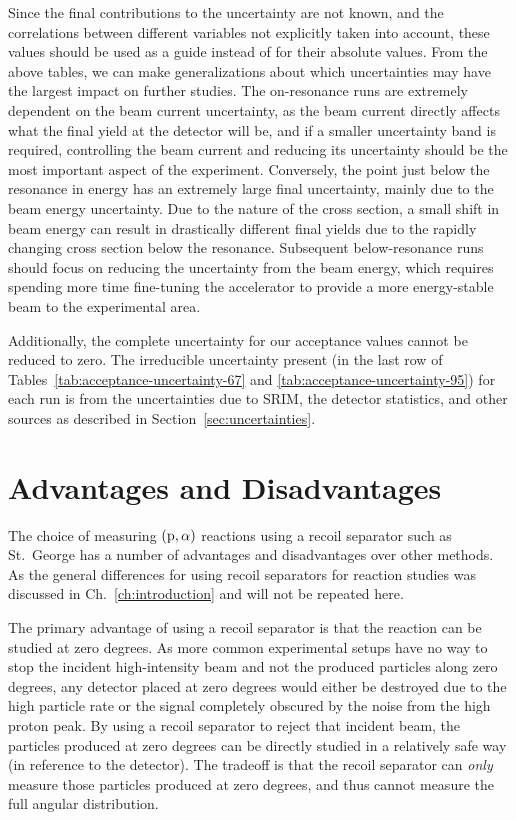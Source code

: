 
Since the final contributions to the uncertainty are not known, and the
correlations between different variables not explicitly taken into
account, these values should be used as a guide instead of for their
absolute values. From the above tables, we can make generalizations
about which uncertainties may have the largest impact on further
studies. The on-resonance runs are extremely dependent on the beam
current uncertainty, as the beam current directly affects what the final
yield at the detector will be, and if a smaller uncertainty band is
required, controlling the beam current and reducing its uncertainty
should be the most important aspect of the experiment. Conversely, the
point just below the resonance in energy has an extremely large final
uncertainty, mainly due to the beam energy uncertainty. Due to the
nature of the cross section, a small shift in beam energy can result in
drastically different final yields due to the rapidly changing cross
section below the resonance. Subsequent below-resonance runs should
focus on reducing the uncertainty from the beam energy, which requires
spending more time fine-tuning the accelerator to provide a more
energy-stable beam to the experimental area.

Additionally, the complete uncertainty for our acceptance values cannot
be reduced to zero. The irreducible uncertainty present (in the last row
of Tables~\ref{tab:acceptance-uncertainty-67} and
\ref{tab:acceptance-uncertainty-95}) for each run is from the
uncertainties due to SRIM, the detector statistics, and other sources as
described in Section~\ref{sec:uncertainties}.


\section{Advantages and Disadvantages}

The choice of measuring $({\rm p},\alpha)$ reactions using a recoil
separator such as St.\ George has a number of advantages and
disadvantages over other methods. As the general differences for using
recoil separators for reaction studies was discussed in
Ch.~\ref{ch:introduction} and will not be repeated here.

The primary advantage of using a recoil separator is that the reaction
can be studied at zero degrees. As more common experimental setups have
no way to stop the incident high-intensity beam and not the produced
particles along zero degrees, any detector placed at zero degrees would
either be destroyed due to the high particle rate or the signal
completely obscured by the noise from the high proton peak. By using a
recoil separator to reject that incident beam, the particles produced at
zero degrees can be directly studied in a relatively safe way (in
reference to the detector). The tradeoff is that the recoil separator
can \textit{only} measure those particles produced at zero degrees, and
thus cannot measure the full angular distribution.

